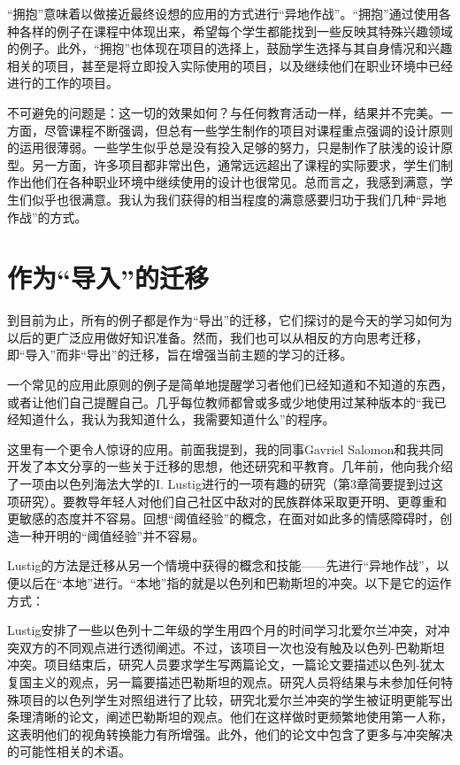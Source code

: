 “拥抱”意味着以做接近最终设想的应用的方式进行“异地作战”。“拥抱”通过使用各种各样的例子在课程中体现出来，希望每个学生都能找到一些反映其特殊兴趣领域的例子。此外，“拥抱”也体现在项目的选择上，鼓励学生选择与其自身情况和兴趣相关的项目，甚至是将立即投入实际使用的项目，以及继续他们在职业环境中已经进行的工作的项目。

不可避免的问题是：这一切的效果如何？与任何教育活动一样，结果并不完美。一方面，尽管课程不断强调，但总有一些学生制作的项目对课程重点强调的设计原则的运用很薄弱。一些学生似乎总是没有投入足够的努力，只是制作了肤浅的设计原型。另一方面，许多项目都非常出色，通常远远超出了课程的实际要求，学生们制作出他们在各种职业环境中继续使用的设计也很常见。总而言之，我感到满意，学生们似乎也很满意。我认为我们获得的相当程度的满意感要归功于我们几种“异地作战”的方式。

\section*{作为“导入”的迁移}

到目前为止，所有的例子都是作为“导出”的迁移，它们探讨的是今天的学习如何为以后的更广泛应用做好知识准备。然而，我们也可以从相反的方向思考迁移，即“导入”而非“导出”的迁移，旨在增强当前主题的学习的迁移。

一个常见的应用此原则的例子是简单地提醒学习者他们已经知道和不知道的东西，或者让他们自己提醒自己。几乎每位教师都曾或多或少地使用过某种版本的“我已经知道什么，我认为我知道什么，我需要知道什么”的程序。

这里有一个更令人惊讶的应用。前面我提到，我的同事Gavriel Salomon和我共同开发了本文分享的一些关于迁移的思想，他还研究和平教育。几年前，他向我介绍了一项由以色列海法大学的I. Lustig进行的一项有趣的研究（第3章简要提到过这项研究）。要教导年轻人对他们自己社区中敌对的民族群体采取更开明、更尊重和更敏感的态度并不容易。回想“阈值经验”的概念，在面对如此多的情感障碍时，创造一种开明的“阈值经验”并不容易。

Lustig的方法是迁移从另一个情境中获得的概念和技能——先进行“异地作战”，以便以后在“本地”进行。“本地”指的就是以色列和巴勒斯坦的冲突。以下是它的运作方式：

Lustig安排了一些以色列十二年级的学生用四个月的时间学习北爱尔兰冲突，对冲突双方的不同观点进行透彻阐述。不过，该项目一次也没有触及以色列-巴勒斯坦冲突。项目结束后，研究人员要求学生写两篇论文，一篇论文要描述以色列-犹太复国主义的观点，另一篇要描述巴勒斯坦的观点。研究人员将结果与未参加任何特殊项目的以色列学生对照组进行了比较，研究北爱尔兰冲突的学生被证明更能写出条理清晰的论文，阐述巴勒斯坦的观点。他们在这样做时更频繁地使用第一人称，这表明他们的视角转换能力有所增强。此外，他们的论文中包含了更多与冲突解决的可能性相关的术语。

